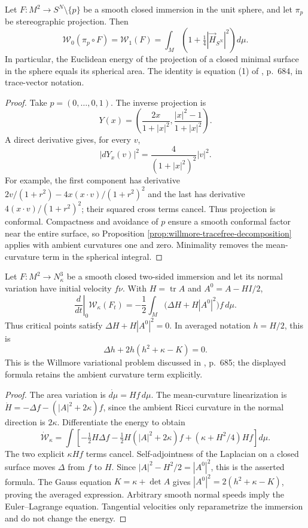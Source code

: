 \begin{proposition}\label{prop:stereographic-willmore-identity}
Let $F:M^2\to S^N\setminus\{p\}$ be a smooth closed immersion in the unit sphere, and let $\pi_p$ be stereographic projection. Then
\[
 \mathcal W_0(\pi_p\circ F)=\mathcal W_1(F)
 =\int_M\left(1+\tfrac14|\vec H_{S^N}|^2\right)d\mu.
\]
In particular, the Euclidean energy of the projection of a closed minimal surface in the sphere equals its spherical area. The identity is equation (1) of \cite{MNWill}, p.~684, in trace-vector notation.
\end{proposition}
\begin{proof}
Take $p=(0,\ldots,0,1)$. The inverse projection is
\[
 Y(x)=\left(\frac{2x}{1+|x|^2},\frac{|x|^2-1}{1+|x|^2}\right).
\]
A direct derivative gives, for every $v$,
\[
 |dY_x(v)|^2=\frac{4}{(1+|x|^2)^2}|v|^2.
\]
For example, the first component has derivative $2v/(1+r^2)-4x(x\cdot v)/(1+r^2)^2$ and the last has derivative $4(x\cdot v)/(1+r^2)^2$; their squared cross terms cancel. Thus projection is conformal. Compactness and avoidance of $p$ ensure a smooth conformal factor near the entire surface, so Proposition \ref{prop:willmore-tracefree-decomposition} applies with ambient curvatures one and zero. Minimality removes the mean-curvature term in the spherical integral.
\end{proof}

\begin{theorem}\label{thm:willmore-first-variation-spaceform}
Let $F:M^2\to N^3_\kappa$ be a smooth closed two-sided immersion and let its normal variation have initial velocity $f\nu$. With $H=\operatorname{tr}A$ and $A^0=A-HI/2$,
\[
 \left.\frac{d}{dt}\right|_{0}\mathcal W_\kappa(F_t)
 =-\frac12\int_M\bigl(\Delta H+H|A^0|^2\bigr)f\,d\mu.
\]
Thus critical points satisfy $\Delta H+H|A^0|^2=0$. In averaged notation $h=H/2$, this is
\[
 \Delta h+2h(h^2+\kappa-K)=0.
\]
This is the Willmore variational problem discussed in \cite{MNWill}, p.~685; the displayed formula retains the ambient curvature term explicitly.
\end{theorem}
\begin{proof}
The area variation is $\dot{d\mu}=Hf\,d\mu$. The mean-curvature linearization is $\dot H=-\Delta f-(|A|^2+2\kappa)f$, since the ambient Ricci curvature in the normal direction is $2\kappa$. Differentiate the energy to obtain
\[
 \dot{\mathcal W}_\kappa
 =\int\left[-\tfrac12H\Delta f-\tfrac12H(|A|^2+2\kappa)f
 +(\kappa+H^2/4)Hf\right]d\mu.
\]
The two explicit $\kappa Hf$ terms cancel. Self-adjointness of the Laplacian on a closed surface moves $\Delta$ from $f$ to $H$. Since $|A|^2-H^2/2=|A^0|^2$, this is the asserted formula. The Gauss equation $K=\kappa+\det A$ gives $|A^0|^2=2(h^2+\kappa-K)$, proving the averaged expression. Arbitrary smooth normal speeds imply the Euler--Lagrange equation. Tangential velocities only reparametrize the immersion and do not change the energy.
\end{proof}

